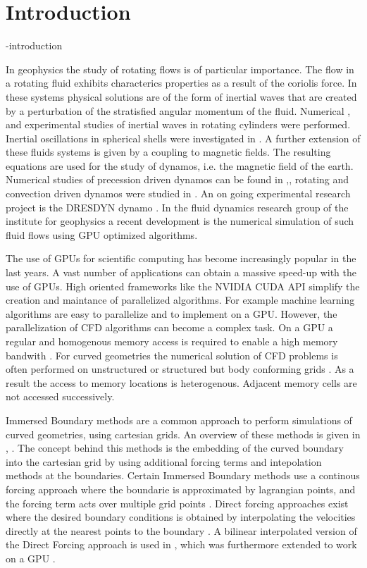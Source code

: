 \chapter{Introduction}

-introduction

In geophysics the study of rotating flows is of particular importance.
The flow in a rotating fluid exhibits characterics properties as a result of the coriolis force.
In these systems physical solutions are of the form of inertial waves
that are created by a perturbation of the stratisfied angular momentum of the fluid.
Numerical \citep{Sauret2012}, \citep{Duguet} and experimental studies \citep{QUOTE} of inertial waves in rotating cylinders were performed.
Inertial oscillations in spherical shells were investigated in \citep{Tilgner1999}.
A further extension of these fluids systems is given by a coupling to magnetic fields.
The resulting equations are used for the study of dynamos, i.e. the magnetic field of the earth.
Numerical studies of precession driven dynamos can be found in \citep{Tilgner2005},\citep{Tilgner2007a},
rotating and convection driven dynamos were studied in \citep{Tilgner2012}.
An on going experimental research project is the DRESDYN dynamo \citep{Stefani2015}.
In the fluid dynamics research group of the institute for geophysics
a recent development is the numerical simulation of such fluid flows using GPU optimized algorithms.

The use of GPUs for scientific computing has become increasingly popular in the last years.
A vast number of applications  can obtain a massive speed-up with the use of GPUs.
High oriented frameworks like the NVIDIA CUDA API simplify the creation
and maintance of parallelized algorithms.
For example machine learning algorithms are easy to parallelize and to implement on a GPU.
However, the parallelization of CFD algorithms can become a complex task.
On a GPU a regular and homogenous memory access is required to enable a high memory bandwith \citep{CUDABP}.
For curved geometries the numerical solution of CFD problems is often performed
on unstructured  or structured but body conforming grids \citep{Mittal2005}.
As a result the access to memory locations is heterogenous.
Adjacent memory cells are not accessed successively.

Immersed Boundary methods are a common approach to perform simulations of curved geometries, using cartesian grids.
An overview of these methods is given in \citep{Mittal2005}, \citep{Gornak2013}.
The concept behind this methods is the embedding of the curved boundary into the cartesian grid
by using additional forcing terms and intepolation methods at the boundaries.
Certain Immersed Boundary methods use a continous forcing approach where the boundarie is approximated by lagrangian points,
and the forcing term acts over multiple grid points \citep{Mittal2005}.
Direct forcing approaches exist where the desired boundary conditions is obtained by interpolating
the velocities directly at the nearest points to the boundary \citep{Fadlun2000}.
A bilinear interpolated version of the Direct Forcing approach is used in \citep{Gornak2013},
which was furthermore extended to work on a GPU \citep{DeLeon2012}.

